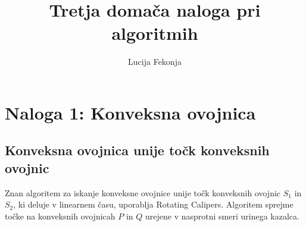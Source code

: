 \documentclass[fleqn]{article}
\title{Tretja domača naloga pri algoritmih}
\author{Lucija Fekonja}
\begin{document}
\maketitle

\section*{Naloga 1: Konveksna ovojnica}

\subsection*{Konveksna ovojnica unije točk konveksnih ovojnic}

Znan algoritem za iskanje konveksne ovojnice unije točk konveksnih ovojnic $S_1$ in $S_2$, ki deluje v linearnem času, uporablja Rotating Calipers.
Algoritem sprejme točke na konveksnih ovojnicah $P$ in $Q$ urejene v nasprotni smeri urinega kazalca.
\end{document}
